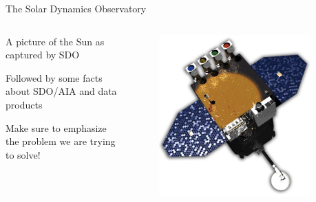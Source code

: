 \documentclass[final]{beamer}
\newlength{\sepwidth}
\newlength{\colwidth}
\newcommand{\separatorcolumn}{\begin{column}{\sepwidth}\end{column}}
\begin{document}
\begin{frame}[t]
\begin{columns}[t]
\separatorcolumn

\begin{column}{\colwidth}

  \begin{block}{The Solar Dynamics Observatory}
    \begin{columns}
      \begin{column}{0.6667\columnwidth}
        A picture of the Sun as captured by SDO

        Followed by some facts about SDO/AIA and data products

        Make sure to emphasize the problem we are trying to solve!
      \end{column}
      \begin{column}{0.333\columnwidth}
        \begin{figure}
          \centering
          \includegraphics[width=\columnwidth]{figures/sdo.png}
        \end{figure}
      \end{column}
    \end{columns}

  \end{block}


\end{column}
\end{columns}
\end{frame}
\end{document}
